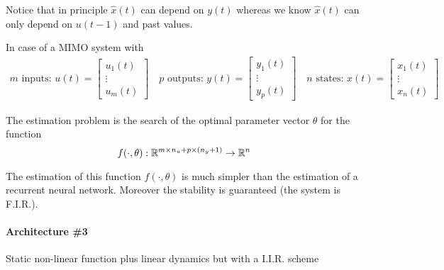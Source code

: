 \begin{remark}
    Notice that in principle $\hat{x}(t)$ can depend on $y(t)$ whereas we know $\hat{x}(t)$ can only depend on $u(t-1)$ and past values.

    In case of a MIMO system with
    \begin{align*}
        m \text{ inputs: } u(t) = \begin{bmatrix}
            u_1(t) \\
            \vdots \\
            u_m(t)
        \end{bmatrix} \quad p \text{ outputs: } y(t) = \begin{bmatrix}
            y_1(t) \\
            \vdots \\
            y_p(t)
        \end{bmatrix} \quad n \text{ states: } x(t) = \begin{bmatrix}
            x_1(t) \\
            \vdots \\
            x_n(t)
        \end{bmatrix}
    \end{align*}

    The estimation problem is the search of the optimal parameter vector $\theta$ for the function
    \[
        f(\cdot, \theta): \mathbb{R}^{m\times n_u + p \times (n_y + 1)} \rightarrow \mathbb{R}^n
    \]

    The estimation of this function $f(\cdot, \theta)$ is much simpler than the estimation of a recurrent neural network.
    Moreover the stability is guaranteed (the system is F.I.R.).
\end{remark}

\paragraph{Architecture \#3} Static non-linear function plus linear dynamics but with a I.I.R. scheme

